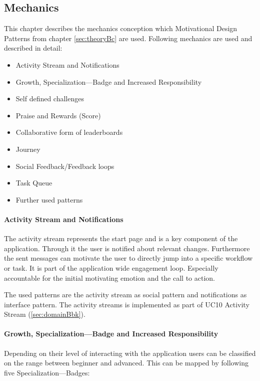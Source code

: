\subsection{Mechanics}
\label{sec:domainCc}

This chapter describes the mechanics conception which Motivational Design Patterns from chapter \ref{sec:theoryBc} are used.
Following mechanics are used and described in detail:
\begin{itemize}
	\item Activity Stream and Notifications
	\item Growth, Specialization—Badge and Increased Responsibility
	\item Self defined challenges
	\item Praise and Rewards (Score)
	\item Collaborative form of leaderboards
	\item Journey
	\item Social Feedback/Feedback loops
	\item Task Queue
	\item Further used patterns
\end{itemize}

\paragraph*{Activity Stream and Notifications}
The activity stream represents the start page and is a key component of the application. Through it the user is notified about relevant changes. Furthermore the sent messages can motivate the user to directly jump into a specific workflow or task. 
It is part of the application wide engagement loop. Especially accountable for the initial motivating emotion and the call to action.

The used patterns are the activity stream as social pattern and notifications as interface pattern.
The activity streams is implemented as part of \ac{UC}10 Activity Stream (\ref{sec:domainBbk}).

\paragraph*{Growth, Specialization—Badge and Increased Responsibility}

Depending on their level of interacting with the application users can be classified on the range between beginner and advanced. This can be mapped by following five Specialization—Badges:

